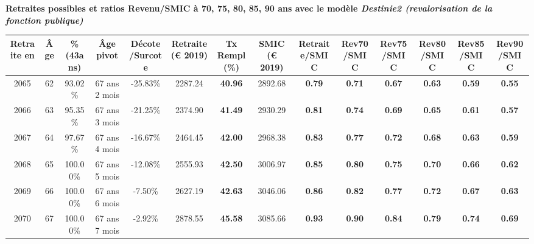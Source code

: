  \vspace{0.1cm} 
{\bf \noindent Retraites possibles et ratios Revenu/SMIC à 70, 75, 80, 85, 90 ans avec le modèle \emph{Destinie2 (revalorisation de la fonction publique)}}  
 
\begin{adjustbox}{max width=\textwidth} 
\begin{tabular}[htb]{|c|c||c|c|c||c|c||c||c|c|c|c|c|c|} 
\hline 
 Retraite en &  Âge &  \%(43ans) &  Âge pivot &  Décote/Surcote &  Retraite (\euro{} 2019) &  Tx Rempl(\%) &  SMIC (\euro{} 2019) &  Retraite/SMIC &  Rev70/SMIC &  Rev75/SMIC &  Rev80/SMIC &  Rev85/SMIC &  Rev90/SMIC \\ 
\hline \hline 
 2065 &  62 &  93.02\% &  67 ans 2 mois &  -25.83\% &  2287.24 &  {\bf 40.96} &  2892.68 &  {\bf {\color{red} 0.79}} &  {\bf {\color{red} 0.71}} &  {\bf {\color{red} 0.67}} &  {\bf {\color{red} 0.63}} &  {\bf {\color{red} 0.59}} &  {\bf {\color{red} 0.55}} \\ 
\hline 
 2066 &  63 &  95.35\% &  67 ans 3 mois &  -21.25\% &  2374.90 &  {\bf 41.49} &  2930.29 &  {\bf {\color{red} 0.81}} &  {\bf {\color{red} 0.74}} &  {\bf {\color{red} 0.69}} &  {\bf {\color{red} 0.65}} &  {\bf {\color{red} 0.61}} &  {\bf {\color{red} 0.57}} \\ 
\hline 
 2067 &  64 &  97.67\% &  67 ans 4 mois &  -16.67\% &  2464.45 &  {\bf 42.00} &  2968.38 &  {\bf {\color{red} 0.83}} &  {\bf {\color{red} 0.77}} &  {\bf {\color{red} 0.72}} &  {\bf {\color{red} 0.68}} &  {\bf {\color{red} 0.63}} &  {\bf {\color{red} 0.59}} \\ 
\hline 
 2068 &  65 &  100.00\% &  67 ans 5 mois &  -12.08\% &  2555.93 &  {\bf 42.50} &  3006.97 &  {\bf {\color{red} 0.85}} &  {\bf {\color{red} 0.80}} &  {\bf {\color{red} 0.75}} &  {\bf {\color{red} 0.70}} &  {\bf {\color{red} 0.66}} &  {\bf {\color{red} 0.62}} \\ 
\hline 
 2069 &  66 &  100.00\% &  67 ans 6 mois &  -7.50\% &  2627.19 &  {\bf 42.63} &  3046.06 &  {\bf {\color{red} 0.86}} &  {\bf {\color{red} 0.82}} &  {\bf {\color{red} 0.77}} &  {\bf {\color{red} 0.72}} &  {\bf {\color{red} 0.67}} &  {\bf {\color{red} 0.63}} \\ 
\hline 
 2070 &  67 &  100.00\% &  67 ans 7 mois &  -2.92\% &  2878.55 &  {\bf 45.58} &  3085.66 &  {\bf {\color{red} 0.93}} &  {\bf {\color{red} 0.90}} &  {\bf {\color{red} 0.84}} &  {\bf {\color{red} 0.79}} &  {\bf {\color{red} 0.74}} &  {\bf {\color{red} 0.69}} \\ 
\hline 
\hline 
\end{tabular} 
\end{adjustbox} 
 
